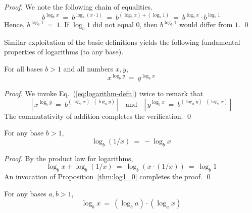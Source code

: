 \begin{proof}
We note the following chain of equalities.
\[  b^{\log_b x} \ = \ b^{\log_b (x \cdot 1)} 
  \ = \ b^{(\log_b x) + (\log_b 1)} 
  \ = \ b^{\log_b x} \cdot b^{\log_b 1}
\]
Hence, $b^{\log_b 1} \ = \ 1$.  If $\log_b 1$ did not equal $0$, then $b^{\log_b 1}$ would differ from $1$.  \qed
\end{proof}

Similar exploitation of the basic definitions yields the following fundamental properties of logarithms (to any base).

\begin{prop}
For all bases $b > 1$ and all numbers $x, y$,
\[ x^{\log_b y} \ = \ y^{\log_b x} \]
\end{prop}

\begin{proof}
We invoke Eq.~(\ref{eq:logarithm-defn}) twice to remark that
\[ \left[x^{\log_b y} \ = \ b^{(\log_b x) \cdot (\log_b y)}\right]
\ \ \mbox{ and } \ \ 
\left[y^{\log_b x}\ = \ b^{(\log_b y) \cdot (\log_b x)}\right] \]
The commutativity of addition completes the verification.  \qed
\end{proof}

\smallskip

\begin{prop}
For any base $b >1$,
\[ \log_b (1/x) \ = \ - \log_b x \]
\end{prop}

\begin{proof}
By the product law for logarithms,
\[ \log_b x + \log_b (1/x) \ = \ \log_b (x \cdot (1/x))
\  = \ \log_b 1
\]
An invocation of Proposition~\ref{thm:log1=0} completes the proof.  \qed
\end{proof}

\smallskip

\begin{prop}
For any bases $a, b >1$,
\begin{equation}
\label{eq:log-exp-0}
\log_b x \ = \ \left(\log_b a \right) \cdot \left( \log_a x \right)
\end{equation}
\end{prop}

